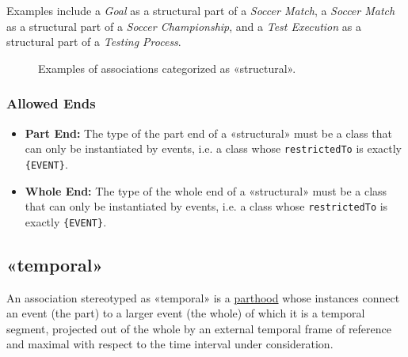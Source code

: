 Examples include a \textit{Goal} as a structural part of a \textit{Soccer Match}, a \textit{Soccer Match} as a structural part of a \textit{Soccer Championship}, and a \textit{Test Execution} as a structural part of a \textit{Testing Process}.

\begin{figure}[h]
    \centering
    
    \caption{Examples of associations categorized as «structural».}
    \label{fig:structural-example}
\end{figure}

\subsubsection{Allowed Ends}

\begin{itemize}
    \item \textbf{Part End:} The type of the part end of a «structural» must be a class that can only be instantiated by events, i.e. a class whose \texttt{restrictedTo} is exactly \texttt{\{EVENT\}}.
    \item \textbf{Whole End:} The type of the whole end of a «structural» must be a class that can only be instantiated by events, i.e. a class whose \texttt{restrictedTo} is exactly \texttt{\{EVENT\}}.
\end{itemize}




\subsection{«temporal»}
\label{stereotype:temporal}

An association stereotyped as «temporal» is a \hyperref[stereotype:parthood]{parthood} whose instances connect an event (the part) to a larger event (the whole) of which it is a temporal segment, projected out of the whole by an external temporal frame of reference and maximal with respect to the time interval under consideration.

